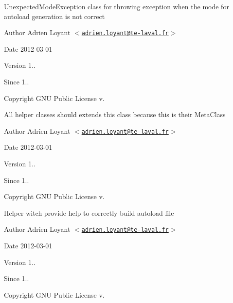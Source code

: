\-Unexpected\-Mode\-Exception class for throwing exception when the mode for autoload generation is not correct

\begin{DoxyAuthor}{\-Author}
\-Adrien \-Loyant $<$\href{mailto:adrien.loyant@te-laval.fr}{\tt adrien.\-loyant@te-\/laval.\-fr}$>$
\end{DoxyAuthor}
\begin{DoxyDate}{\-Date}
2012-\/03-\/01 
\end{DoxyDate}
\begin{DoxyVersion}{\-Version}
1.. 
\end{DoxyVersion}
\begin{DoxySince}{\-Since}
1.. 
\end{DoxySince}
\begin{DoxyCopyright}{\-Copyright}
\-G\-N\-U \-Public \-License v.
\end{DoxyCopyright}


\-All helper classes should extends this class because this is their \-Meta\-Class

\begin{DoxyAuthor}{\-Author}
\-Adrien \-Loyant $<$\href{mailto:adrien.loyant@te-laval.fr}{\tt adrien.\-loyant@te-\/laval.\-fr}$>$
\end{DoxyAuthor}
\begin{DoxyDate}{\-Date}
2012-\/03-\/01 
\end{DoxyDate}
\begin{DoxyVersion}{\-Version}
1.. 
\end{DoxyVersion}
\begin{DoxySince}{\-Since}
1.. 
\end{DoxySince}
\begin{DoxyCopyright}{\-Copyright}
\-G\-N\-U \-Public \-License v.
\end{DoxyCopyright}


\-Helper witch provide help to correctly build autoload file

\begin{DoxyAuthor}{\-Author}
\-Adrien \-Loyant $<$\href{mailto:adrien.loyant@te-laval.fr}{\tt adrien.\-loyant@te-\/laval.\-fr}$>$
\end{DoxyAuthor}
\begin{DoxyDate}{\-Date}
2012-\/03-\/01 
\end{DoxyDate}
\begin{DoxyVersion}{\-Version}
1.. 
\end{DoxyVersion}
\begin{DoxySince}{\-Since}
1.. 
\end{DoxySince}
\begin{DoxyCopyright}{\-Copyright}
\-G\-N\-U \-Public \-License v.
\end{DoxyCopyright}


